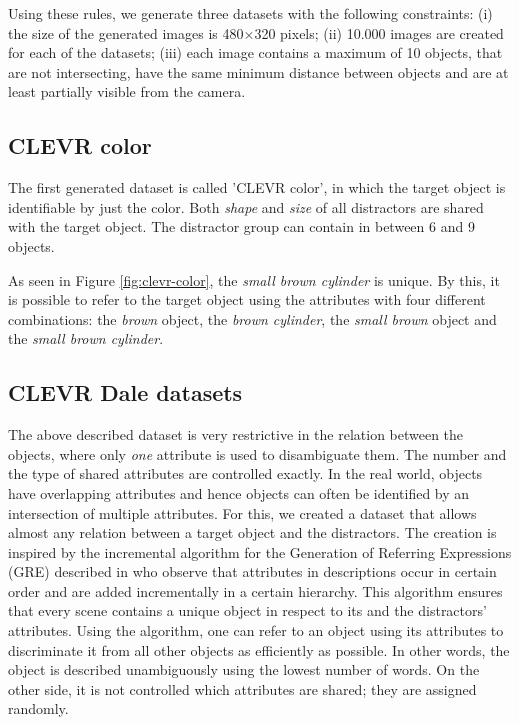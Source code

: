 \documentclass[11pt,a4paper]{article}
\begin{document}
Using these rules, we generate three datasets with the following constraints:
(i) the size of the generated images is 480$\times$320 pixels;
(ii) 10.000 images are created for each of the datasets;
(iii) each image contains a maximum of 10 objects, that are not intersecting, have the same minimum distance between objects and are at least partially visible from the camera.

\subsection{CLEVR color}
The first generated dataset is called 'CLEVR color', in which the target object is identifiable by just the color.
Both \emph{shape} and \emph{size} of all distractors are shared with the target object.
The distractor group can contain in between 6 and 9 objects.

As seen in Figure \ref{fig:clevr-color}, the \emph{small brown cylinder} is unique.
By this, it is possible to refer to the target object using the attributes with four different combinations: the \emph{brown} object, the \emph{brown cylinder}, the \emph{small brown} object and the \emph{small brown cylinder}. %

\subsection{CLEVR Dale datasets}
The above described dataset is very restrictive in the relation between the objects, where only \emph{one} attribute is used to disambiguate them.
The number and the type of shared attributes are controlled exactly.
In the real world, objects have overlapping attributes and hence objects can often be identified by an intersection of multiple attributes.
For this, we created a dataset that allows almost any relation between a target object and the distractors.
The creation is inspired by the incremental algorithm for the Generation of Referring Expressions (GRE) described in \citep{Dale1995} who observe that attributes in descriptions occur in certain order and are added incrementally in a certain hierarchy.
This algorithm ensures that every scene contains a unique object in respect to its and the distractors' attributes.
Using the algorithm, one can refer to an object using its attributes to discriminate it from all other objects as efficiently as possible.
In other words, the object is described unambiguously using the lowest number of words.
On the other side, it is not controlled which attributes are shared; they are assigned randomly.
\end{document}
